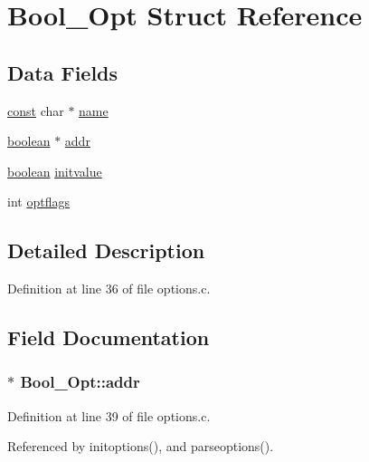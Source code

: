 \hypertarget{structBool__Opt}{\section{Bool\+\_\+\+Opt Struct Reference}
\label{structBool__Opt}
}
\subsection*{Data Fields}
\begin{DoxyCompactItemize}
\item 
\hyperlink{tradstdc_8h_a2c212835823e3c54a8ab6d95c652660e}{const} char $\ast$ \hyperlink{structBool__Opt_a162ffbd03a396916a856d9dd1c01c1c6}{name}
\item 
\hyperlink{global_8h_a531b10dd351aa162d7dcccd1966308b8}{boolean} $\ast$ \hyperlink{structBool__Opt_a7873b24bc3e8f7287e816a2636a384fb}{addr}
\item 
\hyperlink{global_8h_a531b10dd351aa162d7dcccd1966308b8}{boolean} \hyperlink{structBool__Opt_a99e63ca62d95d0de1b67d023e7fa8a74}{initvalue}
\item 
int \hyperlink{structBool__Opt_aa192b4c0efbe0c27c9dd7390cc1fc3b8}{optflags}
\end{DoxyCompactItemize}


\subsection{Detailed Description}


Definition at line 36 of file options.\+c.



\subsection{Field Documentation}
\hypertarget{structBool__Opt_a7873b24bc3e8f7287e816a2636a384fb}{
\subsubsection[{addr}]{$\ast$ Bool\+\_\+\+Opt\+::addr}}\label{structBool__Opt_a7873b24bc3e8f7287e816a2636a384fb}


Definition at line 39 of file options.\+c.



Referenced by initoptions(), and parseoptions().

